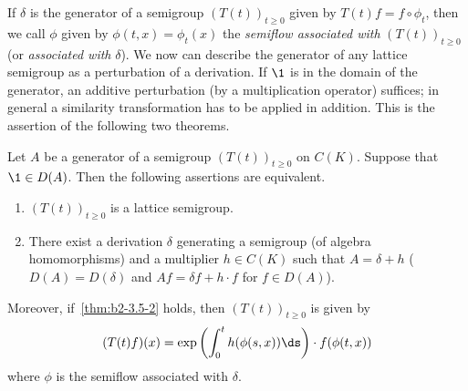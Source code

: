 If\/ $\delta$ is the generator of a semigroup $(T(t))_{t \geq 0}$ given by $T(t)f = f \circ \phi_{t}$, then we call $\phi$ given by $\phi(t,x) = \phi_{t}(x)$ the \emph{semiflow associated with} $(T(t))_{t \geq 0}$ (or \emph{associated with} $\delta$).
We now can describe the generator of any lattice semigroup as a perturbation of a derivation.
If\/ $\1$ is in the domain of the generator, an additive perturbation (by a multiplication operator) suffices; in general a similarity transformation has to be applied in addition.
This is the assertion of the following two theorems.

\begin{theorem}\label{thm:b2-3.5}
Let $A$ be a generator of a semigroup $(T(t))_{t \geq 0}$ on $C(K)$.
Suppose that $\1 \in D(A)$.
Then the following assertions are equivalent.
\begin{enumerate}[\upshape (a)]
\item \label{thm:b2-3.5-1}
$(T(t))_{t \geq 0}$ is a lattice semigroup.
\item \label{thm:b2-3.5-2}
There exist a derivation $\delta$ generating a semigroup (of algebra homomorphisms) and a multiplier $h \in C(K)$ such that $A = \delta + h$ (\ie  $D(A) = D(\delta)$ and $Af = \delta f + h \cdot f$ for $f \in D(A)$).
\end{enumerate}

Moreover, if~\ref{thm:b2-3.5-2} holds, then $(T(t))_{t \geq 0}$ is given by
\begin{equation}\label{eq:b2-3.6}
(T(t)f)(x) = \exp\left(\int_{0}^{t} h(\phi(s,x)) \ds \right) \cdot f(\phi(t,x))
\end{equation}
where $\phi$ is the semiflow associated with $\delta$.
\end{theorem}

